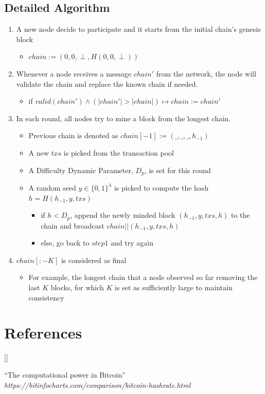\documentclass[twoside]{article}
\def\beginrefs{\begin{list}%
        {[\arabic{equation}]}{\usecounter{equation}
         \setlength{\leftmargin}{2.0truecm}\setlength{\labelsep}{0.4truecm}%
         \setlength{\labelwidth}{1.6truecm}}}
\def\endrefs{\end{list}}
\def\bibentry#1{\item[\hbox{[#1]}]}
\begin{document}
\subsection{Detailed Algorithm}
\begin{enumerate}
    \item A new node decide to participate and it starts from the initial chain's genesis block
    \begin{itemize}
        \item $chain := (0, 0, \perp, H(0, 0, \perp))$
    \end{itemize}
    \item Whenever a node receives a message $chain'$ from the network, the node will validate the chain and replace the known chain if needed.
    \begin{itemize}
        \item if $valid(chain') \wedge ( |chain'| > |chain| ) \longmapsto chain := chain'$ 
    \end{itemize}
    \item In each round, all nodes try to mine a block from the longest chain.
    \begin{itemize}
        \item Previous chain is denoted as $chain[-1] := (\_, \_, \_, h_{-1})$
        \item A new $txs$ is picked from the transaction pool
        \item A Difficulty Dynamic Parameter, $D_p$, is set for this round
        \item A random seed $y \in \{0, 1\}^{\lambda}$ is picked to compute the hash $h = H(h_{-1}, y, txs)$
        \begin{itemize}
            \item if $h < D_p$, append the newly minded block $(h_{-1}, y, txs, h)$ to the chain and broadcast $chain||(h_{-1}, y, txs, h)$
            \item else, go back to $step 1$ and try again
        \end{itemize}
    \end{itemize}
    \item $chain[: -K]$ is considered as final
    \begin{itemize}
        \item For example, the longest chain that a node observed so far removing the last $K$ blocks, for which $K$ is set as sufficiently large to maintain consistency
    \end{itemize}
\end{enumerate}

\section*{References}
\beginrefs
\bibentry{1} 
``The computational power in Bitcoin''
{\it https://bitinfocharts.com/comparison/bitcoin-hashrate.html}
\endrefs

\end{document}

